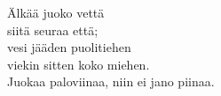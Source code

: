 
Älkää juoko vettä \\ siitä seuraa että; \\ vesi jääden puolitiehen \\ viekin sitten koko miehen. \\ Juokaa paloviinaa, niin ei jano piinaa.